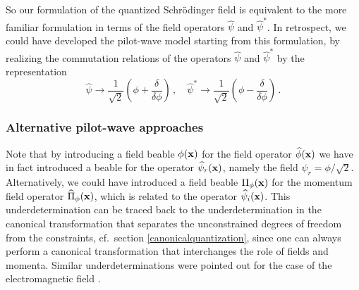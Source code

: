 \documentclass[12pt]{article}
\begin{document}
So our formulation of the quantized Schr{\"o}\-ding\-er field is equivalent to the more familiar formulation in terms of the field operators ${\widehat \psi}$ and ${\widehat \psi^*}$. In retrospect, we could have developed the pilot-wave model starting from this formulation, by realizing the commutation relations of the operators ${\widehat \psi}$ and ${\widehat \psi^*}$ by the representation
\begin{equation}
{\widehat \psi} \to \frac{1}{\sqrt{2}}\left( \phi + \frac{\delta }{\delta \phi} \right)\,,\quad  {\widehat \psi^*} \to \frac{1}{\sqrt{2}}\left( \phi - \frac{\delta }{\delta \phi} \right) \,.
\label{s.18.1}
\end{equation}

\subsubsection{Alternative pilot-wave approaches}\label{alternativepilotwaveapproaches}
Note that by introducing a field beable $\phi({\bf x})$ for the field operator $\widehat{\phi}({\bf x})$ we have in fact introduced a beable for the operator ${\widehat \psi}_r({\bf x})$, namely the field $\psi_r=\phi/\sqrt{2}$. Alternatively, we could have introduced a field beable $\Pi_\phi({\bf x})$ for the momentum field operator $\widehat{\Pi}_{\phi}({\bf x})$, which is related to the operator ${\widehat \psi}_i({\bf x})$. This underdetermination can be traced back to the underdetermination in the canonical transformation that separates the unconstrained degrees of freedom from the constraints, cf.\ section \ref{canonicalquantization}, since one can always perform a canonical transformation that interchanges the role of fields and momenta. Similar underdeterminations were pointed out for the case of the electromagnetic field \cite{baumann86}. 
\end{document}
